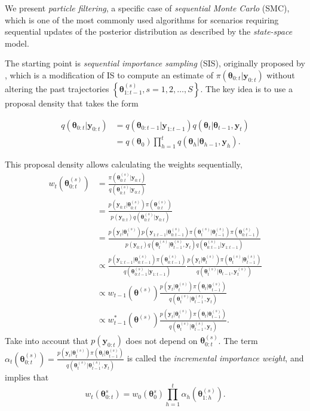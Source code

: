 We present \textit{particle filtering}, a specific case of \textit{sequential Monte Carlo} (SMC), which is one of the most commonly used algorithms for scenarios requiring sequential updates of the posterior distribution as described by the \textit{state-space} model.

The starting point is \textit{sequential importance sampling} (SIS), originally proposed by \cite{handschin1969monte}, which is a modification of IS to compute an estimate of $\pi(\bm{\theta}_{0:t}|\bm{y}_{0:t})$ without altering the past trajectories $\left\{\bm{\theta}^{(s)}_{1:t-1}, s=1,2,\dots,S\right\}$. The key idea is to use a proposal density that takes the form

\begin{align*}
	q(\bm{\theta}_{0:t}|\bm{y}_{0:t}) &= q(\bm{\theta}_{0:t-1}|\bm{y}_{1:t-1})q(\bm{\theta}_t|\bm{\theta}_{t-1},\bm{y}_{t}) \\
	&= q(\bm{\theta}_0)\prod_{h=1}^{t}q(\bm{\theta}_h|\bm{\theta}_{h-1},\bm{y}_{h}).
\end{align*}

This proposal density allows calculating the weights sequentially,
\begin{align*}
	w_{t}(\bm{\theta}^{(s)}_{0:t})&=\frac{\pi(\bm{\theta}_{0:t}^{(s)}|\bm{y}_{0:t})}{q(\bm{\theta}_{0:t}^{(s)}|\bm{y}_{0:t})}\\
	&=\frac{p(\bm{y}_{0:t}|\bm{\theta}_{0:t}^{(s)})\pi(\bm{\theta}_{0:t}^{(s)})}{p(\bm{y}_{0:t})q(\bm{\theta}_{0:t}^{(s)}|\bm{y}_{0:t})}\\
	&=\frac{p(\bm{y}_{t}|\bm{\theta}_{t}^{(s)})p(\bm{y}_{1:t-1}|\bm{\theta}_{0:t-1}^{(s)})\pi(\bm{\theta}_{t}^{(s)}|\bm{\theta}_{t-1}^{(s)})\pi(\bm{\theta}_{0:t-1}^{(s)})}{p(\bm{y}_{0:t})q(\bm{\theta}_{t}^{(s)}|\bm{\theta}_{t-1}^{(s)},\bm{y}_{t})q(\bm{\theta}_{0:t-1}^{(s)}|\bm{y}_{1:t-1})}\\
	&\propto\frac{p(\bm{y}_{1:t-1}|\bm{\theta}_{0:t-1}^{(s)})\pi(\bm{\theta}_{0:t-1}^{(s)})}{q(\bm{\theta}_{0:t-1}^{(s)}|\bm{y}_{1:t-1})}\frac{p(\bm{y}_{t}|\bm{\theta}_{t}^{(s)})\pi(\bm{\theta}_{t}^{(s)}|\bm{\theta}_{t-1}^{(s)})}{q(\bm{\theta}_{t}^{(s)}|\bm{\theta}_{t-1},\bm{y}_{t}^{(s)})}\\
	&\propto w_{t-1}(\bm{\theta}^{(s)})\frac{p(\bm{y}_{t}|\bm{\theta}_{t}^{(s)})\pi(\bm{\theta}_{t}|\bm{\theta}_{t-1}^{(s)})}{q(\bm{\theta}_t^{(s)}|\bm{\theta}_{t-1}^{(s)},\bm{y}_{t})}\\
	&\propto w_{t-1}^*(\bm{\theta}^{(s)})\frac{p(\bm{y}_{t}|\bm{\theta}_{t}^{(s)})\pi(\bm{\theta}_{t}|\bm{\theta}_{t-1}^{(s)})}{q(\bm{\theta}_t^{(s)}|\bm{\theta}_{t-1}^{(s)},\bm{y}_{t})}.
\end{align*} 
Take into account that $p(\bm{y}_{0:t})$ does not depend on $\bm{\theta}^{(s)}_{0:t}$. The term $\alpha_t(\bm{\theta}_{0:t}^{(s)})=\frac{p(\bm{y}_{t}|\bm{\theta}_{t}^{(s)})\pi(\bm{\theta}_{t}|\bm{\theta}_{t-1}^{(s)})}{q(\bm{\theta}_t^{(s)}|\bm{\theta}_{t-1}^{(s)},\bm{y}_{t})}$ is called the \textit{incremental importance weight}, and implies that
$$w_t(\bm{\theta}^{s}_{0:t})=w_0(\bm{\theta}^{s}_{0})\prod_{h=1}^{t}\alpha_h(\bm{\theta}_{1:h}^{(s)}).$$ 

